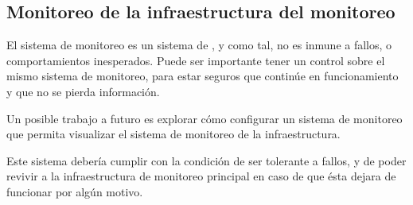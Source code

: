 \subsection{Monitoreo de la infraestructura del monitoreo}
\label{del-monitoreo}

El sistema de monitoreo es un sistema de , y como tal, no es inmune a
fallos,  o comportamientos inesperados. Puede ser importante tener un
control sobre el mismo sistema de monitoreo, para estar seguros que continúe en
funcionamiento y que no se pierda información.

Un posible trabajo a futuro es explorar cómo configurar un sistema de monitoreo
que permita visualizar el sistema de monitoreo de la infraestructura.

Este sistema debería cumplir con la condición de ser tolerante a fallos, y de
poder revivir a la infraestructura de monitoreo principal en caso de que ésta
dejara de funcionar por algún motivo.
